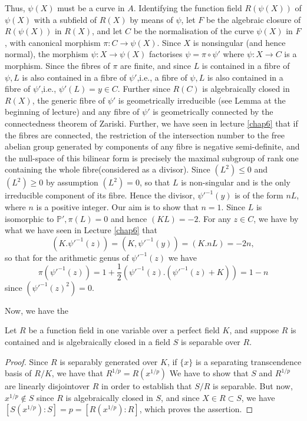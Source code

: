 Thus, $\psi(X)$ must be a curve in $A$. Identifying the function field
$R(\psi(X))$ of $\psi(X)$ with a subfield of $R(X)$ by means of
$\psi$, let $F$ be the algebraic closure of $R(\psi(X))$ in $R(X)$,
and let $C$ be the normalisation of the curve $\psi(X)$ in $F$, with
canonical morphism $\pi:C \to \psi(X)$. Since $X$ is nonsingular (and
hence normal), the morphism $\psi:X \to \psi(X)$ factorises $\psi=\pi
\circ \psi'$ where $\psi :X\to C$ is a morphism. Since the fibres of $\pi$
are finite, and since $L$ is contained in a fibre of $\psi, L$ is also
contained in a fibre of $\psi'$,i.e., a fibre of $\psi, L$ is also
contained in a fibre of $\psi'$,i.e., $\psi'(L)=y \in C$. Further
since $R(C)$ is algebraically closed in $R(X)$, the generic fibre of
$\psi'$ is geometrically irreducible (see Lemma at the beginning of
lecture) and any fibre of $\psi'$ is geometrically\pageoriginale
connected by the 
connectedness theorem of Zariski. Further, we have seen in lecture \ref{chap6}
that if the fibres are connected, the restriction of the intersection
number to the free abelian group generated by components of any fibre
is negative semi-definite, and the null-space of this bilinear form is
precisely the maximal subgroup of rank one containing the whole
fibre(considered as a divisor). Since $(L^2)\leq 0$ and $(L^2)\geq 0$
by assumption $(L^2)=0$, so that $L$ is non-singular and is the only
irreducible component of its fibre. Hence the divisor, $\psi'^{-1}(y)$
is of the form $nL$, where $n$ is a positive integer. Our aim is to
show that $n=1$. Since $L$ is isomorphic to $\mathbb{P}',\pi(L)=0$ and
hence $(KL)=-2$. For any $z \in C$, we have by what we have seen in
Lecture \ref{chap6} that 
$$
(K. \psi'^{-1}(z))=(K, \psi'^{-1}(y))=(K.nL)=-2n,
$$
so that for the arithmetic genus of $\psi'^{-1}(z)$ we have
$$
\pi(\psi'^{-1}(z))=1+\frac{1}{2}(\psi'^{-1}(z).(\psi'^{-1}(z)+K))=1-n 
$$
since $(\psi'^{-1}(z)^2)=0$.

Now, we have the

\begin{lemma*}%
  Let $R$ be a function field in one variable over a perfect field
  $K$, and suppose $R$ is contained and is algebraically closed in a
  field $S$ is separable over $R$. 
\end{lemma*}

\begin{proof}
  Since $R$ is separably generated over $K$, if $\{x\}$ is a
  separating transcendence basis of $R/K$, we have that
  $R^{1/p}=R(x^{1/p})$ We have to show that $S$ and $R^{1/p}$ are
  linearly disjoint\pageoriginale over $R$ in order to establish that $S/R$ is
  separable. But now, $x^{1/p}\notin S$ since $R$ is algebraically
  closed in $S$, and since $X \in R \subset S$, we have
  $[S(x^{1/p}):S]=p=[R(x^{1/p}):R]$, which proves the assertion. 
\end{proof}

